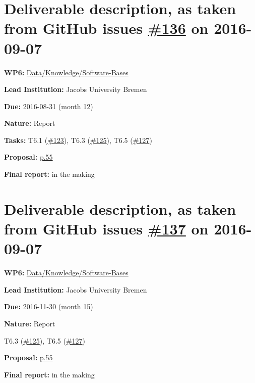\section*{\texorpdfstring{Deliverable description, as taken from GitHub
issues
\href{https://github.com/OpenDreamKit/OpenDreamKit/issues/136}{\#136} on
2016-09-07}{Deliverable description, as taken from GitHub issue \#136 on 2016-09-07}}\label{deliverable-description-as-taken-from-github-issues-136-on-2016-09-07}

\begin{compactitem}
\tightlist
\item
  \textbf{WP6:}
  \href{https://github.com/OpenDreamKit/OpenDreamKit/tree/master/WP6}{Data/Knowledge/Software-Bases}
\item
  \textbf{Lead Institution:} Jacobs University Bremen
\item
  \textbf{Due:} 2016-08-31 (month 12)
\item
  \textbf{Nature:} Report
\item
  \textbf{Tasks:} T6.1
  (\href{https://github.com/OpenDreamKit/OpenDreamKit/issues/123}{\#123}),
  T6.3
  (\href{https://github.com/OpenDreamKit/OpenDreamKit/issues/125}{\#125}),
  T6.5
  (\href{https://github.com/OpenDreamKit/OpenDreamKit/issues/127}{\#127})
\item
  \textbf{Proposal:}
  \href{https://github.com/OpenDreamKit/OpenDreamKit/raw/master/Proposal/proposal-www.pdf}{p.55}
\item
  \textbf{Final report:} in the making
\end{compactitem}

\section*{\texorpdfstring{Deliverable description, as taken from GitHub issues
    \href{https://github.com/OpenDreamKit/OpenDreamKit/issues/137}{\#137} on
    2016-09-07}{Deliverable description, as taken from GitHub issue \#137 on
    2016-09-07}}\label{deliverable-description-as-taken-from-github-issues-137-on-2016-09-07}
\begin{compactitem}
\tightlist
\item
  \textbf{WP6:}
  \href{https://github.com/OpenDreamKit/OpenDreamKit/tree/master/WP6}{Data/Knowledge/Software-Bases}
\item
  \textbf{Lead Institution:} Jacobs University Bremen
\item
  \textbf{Due:} 2016-11-30 (month 15)
\item
  \textbf{Nature:} Report
\item
  T6.3
  (\href{https://github.com/OpenDreamKit/OpenDreamKit/issues/125}{\#125}),
  T6.5
  (\href{https://github.com/OpenDreamKit/OpenDreamKit/issues/127}{\#127})
\item
  \textbf{Proposal:}
  \href{https://github.com/OpenDreamKit/OpenDreamKit/raw/master/Proposal/proposal-www.pdf}{p.55}
\item
  \textbf{Final report:} in the making
\end{compactitem}

